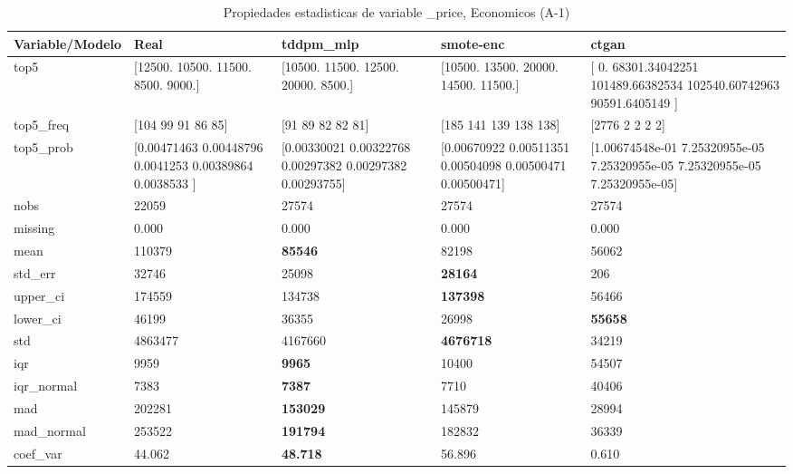 \begin{table}[H]
\centering
\fontsize{8}{14}\selectfont
\caption{Propiedades  estadisticas de variable \_price, Economicos (A-1)}
\label{table-stats-economicos-a-1-_price}
\begin{tabular}{|l|m{10em}|m{10em}|m{10em}|m{10em}|}
\hline
 \rowcolor[gray]{0.8}
Variable/Modelo & Real & tddpm\_mlp & smote-enc & ctgan \\
\hline top5 & [12500. 10500. 11500.  8500.  9000.] & [10500. 11500. 12500. 20000.  8500.] & [10500. 13500. 20000. 14500. 11500.] & [     0.          68301.34042251 101489.66382534 102540.60742963
  90591.6405149 ] \\
\hline top5\_freq & [104  99  91  86  85] & [91 89 82 82 81] & [185 141 139 138 138] & [2776    2    2    2    2] \\
\hline top5\_prob & [0.00471463 0.00448796 0.0041253  0.00389864 0.0038533 ] & [0.00330021 0.00322768 0.00297382 0.00297382 0.00293755] & [0.00670922 0.00511351 0.00504098 0.00500471 0.00500471] & [1.00674548e-01 7.25320955e-05 7.25320955e-05 7.25320955e-05
 7.25320955e-05] \\
\hline nobs & 22059 & 27574 & 27574 & 27574 \\
\hline missing & 0.000 & 0.000 & 0.000 & 0.000 \\
\hline mean & 110379 & \bfseries 85546 & 82198 & \cellcolor[rgb]{0.9, 0.54, 0.52} 56062 \\
\hline std\_err & 32746 & 25098 & \bfseries 28164 & \cellcolor[rgb]{0.9, 0.54, 0.52} 206 \\
\hline upper\_ci & 174559 & 134738 & \bfseries 137398 & \cellcolor[rgb]{0.9, 0.54, 0.52} 56466 \\
\hline lower\_ci & 46199 & 36355 & \cellcolor[rgb]{0.9, 0.54, 0.52} 26998 & \bfseries 55658 \\
\hline std & 4863477 & 4167660 & \bfseries 4676718 & \cellcolor[rgb]{0.9, 0.54, 0.52} 34219 \\
\hline iqr & 9959 & \bfseries 9965 & 10400 & \cellcolor[rgb]{0.9, 0.54, 0.52} 54507 \\
\hline iqr\_normal & 7383 & \bfseries 7387 & 7710 & \cellcolor[rgb]{0.9, 0.54, 0.52} 40406 \\
\hline mad & 202281 & \bfseries 153029 & 145879 & \cellcolor[rgb]{0.9, 0.54, 0.52} 28994 \\
\hline mad\_normal & 253522 & \bfseries 191794 & 182832 & \cellcolor[rgb]{0.9, 0.54, 0.52} 36339 \\
\hline coef\_var & 44.062 & \bfseries 48.718 & 56.896 & \cellcolor[rgb]{0.9, 0.54, 0.52} 0.610 \\

\end{tabular}
\end{table}
